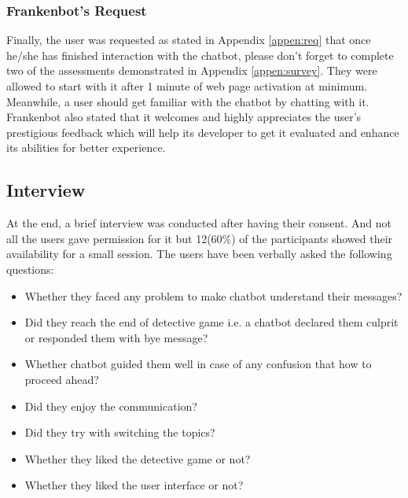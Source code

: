 \subsubsection*{Frankenbot's Request}
Finally, the user was requested as stated in Appendix \ref{appen:req} that once he/she has finished interaction with the chatbot, please don't forget to complete two of the assessments demonstrated in Appendix \ref{appen:survey}. They were allowed to start with it after 1 minute of web page activation at minimum. Meanwhile, a user should get familiar with the chatbot by chatting with it. Frankenbot also stated that it welcomes and highly appreciates the user's prestigious feedback which will help its developer to get it evaluated and enhance its abilities for better experience.

\subsection{Interview\label{subsec:interview}}
At the end, a brief interview was conducted after having their consent. And not all the users gave permission for it but 12(60\%) of the participants showed their availability for a small session. The users have been verbally asked the following questions:
\begin{itemize}
    \item Whether they faced any problem to make chatbot understand their messages?
    \item Did they reach the end of detective game i.e. a chatbot declared them culprit or responded them with bye message?
    \item Whether chatbot guided them well in case of any confusion that how to proceed ahead?
    \item Did they enjoy the communication?
    \item Did they try with switching the topics?
    \item Whether they liked the detective game or not?
    \item Whether they liked the user interface or not?
\end{itemize}

